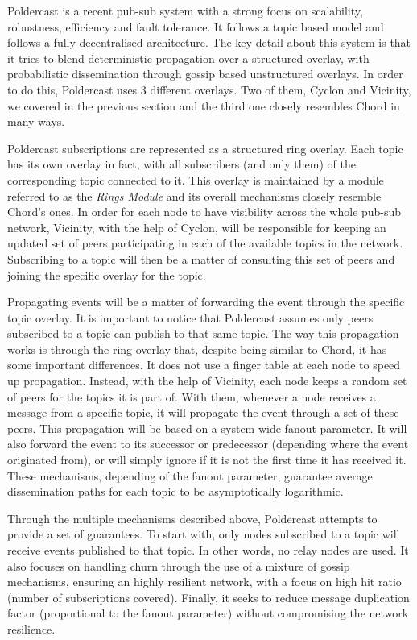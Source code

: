 Poldercast \cite{Setty2012} is a recent pub-sub system with
a strong focus on scalability, robustness, efficiency and fault
tolerance. It follows a topic based model and follows a fully
decentralised architecture. The key detail about this system is that it
tries to blend deterministic propagation over a structured overlay, with
probabilistic dissemination through gossip based unstructured overlays.
In order to do this, Poldercast uses 3 different overlays. Two of them,
Cyclon and Vicinity, we covered in the previous section and the third
one closely resembles Chord in many ways.

Poldercast subscriptions are represented as a structured ring overlay.
Each topic has its own overlay in fact, with all subscribers (and only
them) of the corresponding topic connected to it. This overlay is
maintained by a module referred to as the \emph{Rings Module} and its
overall mechanisms closely resemble Chord's ones. In order for each node
to have visibility across the whole pub-sub network, Vicinity, with the
help of Cyclon, will be responsible for keeping an updated set of peers
participating in each of the available topics in the network.
Subscribing to a topic will then be a matter of consulting this set of
peers and joining the specific overlay for the topic.

Propagating events will be a matter of forwarding the event through the
specific topic overlay. It is important to notice that Poldercast
assumes only peers subscribed to a topic can publish to that same topic.
The way this propagation works is through the ring overlay that, despite
being similar to Chord, it has some important differences. It does not
use a finger table at each node to speed up propagation. Instead, with
the help of Vicinity, each node keeps a random set of peers for the
topics it is part of. With them, whenever a node receives a message from
a specific topic, it will propagate the event through a set of these
peers. This propagation will be based on a system wide fanout parameter.
It will also forward the event to its successor or predecessor
(depending where the event originated from), or will simply ignore if it
is not the first time it has received it. These mechanisms, depending of
the fanout parameter, guarantee average dissemination paths for each
topic to be asymptotically logarithmic.

Through the multiple mechanisms described above, Poldercast attempts to
provide a set of guarantees. To start with, only nodes subscribed to a
topic will receive events published to that topic. In other words, no
relay nodes are used. It also focuses on handling churn through the use
of a mixture of gossip mechanisms, ensuring an highly resilient network,
with a focus on high hit ratio (number of subscriptions covered).
Finally, it seeks to reduce message duplication factor (proportional to
the fanout parameter) without compromising the network resilience.

